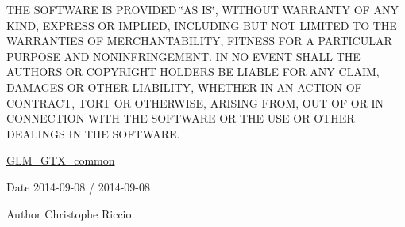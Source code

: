 T\-H\-E S\-O\-F\-T\-W\-A\-R\-E I\-S P\-R\-O\-V\-I\-D\-E\-D \char`\"{}\-A\-S I\-S\char`\"{}, W\-I\-T\-H\-O\-U\-T W\-A\-R\-R\-A\-N\-T\-Y O\-F A\-N\-Y K\-I\-N\-D, E\-X\-P\-R\-E\-S\-S O\-R I\-M\-P\-L\-I\-E\-D, I\-N\-C\-L\-U\-D\-I\-N\-G B\-U\-T N\-O\-T L\-I\-M\-I\-T\-E\-D T\-O T\-H\-E W\-A\-R\-R\-A\-N\-T\-I\-E\-S O\-F M\-E\-R\-C\-H\-A\-N\-T\-A\-B\-I\-L\-I\-T\-Y, F\-I\-T\-N\-E\-S\-S F\-O\-R A P\-A\-R\-T\-I\-C\-U\-L\-A\-R P\-U\-R\-P\-O\-S\-E A\-N\-D N\-O\-N\-I\-N\-F\-R\-I\-N\-G\-E\-M\-E\-N\-T. I\-N N\-O E\-V\-E\-N\-T S\-H\-A\-L\-L T\-H\-E A\-U\-T\-H\-O\-R\-S O\-R C\-O\-P\-Y\-R\-I\-G\-H\-T H\-O\-L\-D\-E\-R\-S B\-E L\-I\-A\-B\-L\-E F\-O\-R A\-N\-Y C\-L\-A\-I\-M, D\-A\-M\-A\-G\-E\-S O\-R O\-T\-H\-E\-R L\-I\-A\-B\-I\-L\-I\-T\-Y, W\-H\-E\-T\-H\-E\-R I\-N A\-N A\-C\-T\-I\-O\-N O\-F C\-O\-N\-T\-R\-A\-C\-T, T\-O\-R\-T O\-R O\-T\-H\-E\-R\-W\-I\-S\-E, A\-R\-I\-S\-I\-N\-G F\-R\-O\-M, O\-U\-T O\-F O\-R I\-N C\-O\-N\-N\-E\-C\-T\-I\-O\-N W\-I\-T\-H T\-H\-E S\-O\-F\-T\-W\-A\-R\-E O\-R T\-H\-E U\-S\-E O\-R O\-T\-H\-E\-R D\-E\-A\-L\-I\-N\-G\-S I\-N T\-H\-E S\-O\-F\-T\-W\-A\-R\-E.

\hyperlink{group__gtx__common}{G\-L\-M\-\_\-\-G\-T\-X\-\_\-common}

\begin{DoxyDate}{Date}
2014-\/09-\/08 / 2014-\/09-\/08 
\end{DoxyDate}
\begin{DoxyAuthor}{Author}
Christophe Riccio 
\end{DoxyAuthor}
